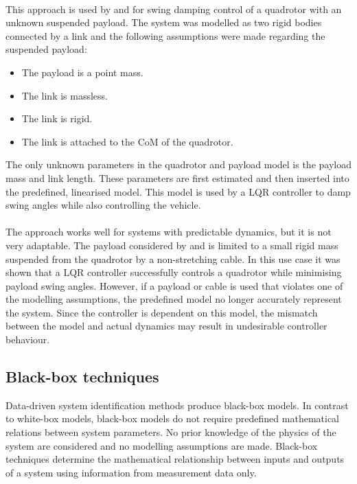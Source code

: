         \paragraph{} 
        This approach is used by \cite{Erasmus2020} and \cite{Slabber2020} for swing damping control of a quadrotor with an unknown suspended payload.
        The system was modelled as two rigid bodies connected by a link and the following assumptions were made regarding the suspended payload:
        \begin{itemize}
            \item The payload is a point mass.
            \item The link is massless.
            \item The link is rigid.
            \item The link is attached to the CoM of the quadrotor.
        \end{itemize}
        The only unknown parameters in the quadrotor and payload model is the payload mass and link length.
        These parameters are first estimated and then inserted into the predefined, linearised model.
        This model is used by a LQR controller to damp swing angles while also controlling the vehicle.

        \paragraph{} 
        The approach works well for systems with predictable dynamics, but it is not very adaptable.
        The payload considered by \cite{Erasmus2020} and \cite{Slabber2020} is limited to a small rigid mass suspended from the quadrotor by a non-stretching cable. 
        In this use case it was shown that a LQR controller successfully controls a quadrotor while minimising payload swing angles.
        However, if a payload or cable is used that violates one of the modelling assumptions, the predefined model no longer accurately represent the system.
        Since the controller is dependent on this model, the mismatch between the model and actual dynamics may result in undesirable controller behaviour.

    \subsection{Black-box techniques}

        Data-driven system identification methods produce black-box models.
        In contrast to white-box models, black-box models do not require predefined mathematical relations between system parameters.
        No prior knowledge of the physics of the system are considered and no modelling assumptions are made.
        Black-box techniques determine the mathematical relationship between inputs and outputs of a system using information from measurement data only.

